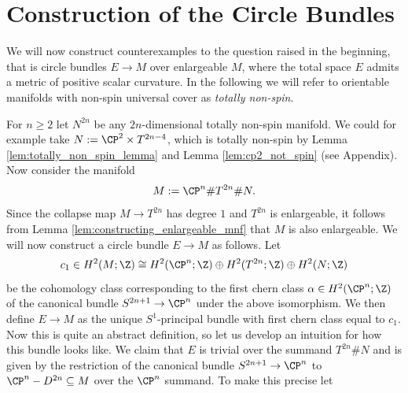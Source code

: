 \section{Construction of the Circle Bundles}

We will now construct counterexamples to the question raised in the beginning, that is circle bundles $E \to M$ over enlargeable $M$, where the total space $E$ admits a metric of positive scalar curvature. 
In the following we will refer to orientable manifolds with non-spin universal cover as \emph{totally non-spin}.

For $n \geq 2$ let $N^{2n}$ be any $2n$-dimensional totally non-spin manifold. We could for example take $N:= \CP^2 \times T^{2n-4}$, which is totally non-spin by Lemma \ref{lem:totally_non_spin_lemma} and Lemma \ref{lem:cp2_not_spin} (see Appendix). Now consider the manifold
\[
M := \CP^n \# T^{2n} \# N.
\]
Since the collapse map $M \to T^{2n}$ has degree $1$ and $T^{2n}$ is enlargeable, it follows from Lemma \ref{lem:constructing_enlargeable_mnf} that $M$ is also enlargeable. We will now construct a circle bundle $E \to M$ as follows. Let 
\[
c_1 \in H^2(M;\Z) \cong H^2(\CP^n;\Z) \oplus H^2(T^{2n};\Z) \oplus H^2(N;\Z)
\]
be the cohomology class corresponding to the first chern class $\alpha \in H^2(\CP^n;\Z)$ of the canonical bundle $S^{2n+1} \to \CP^n$ under the above isomorphism. We then define $E \to M$ as the unique $S^1$-principal bundle with first chern class equal to $c_1$. Now this is quite an abstract definition, so let us develop an intuition for how this bundle looks like. We claim that $E$ is trivial over the summand $T^{2n} \# N$ and is given by the restriction of the canonical bundle $S^{2n+1} \to \CP^n$ to $\CP^n - D^{2n} \subseteq M$ over the $\CP^n$ summand. To make this precise let 
